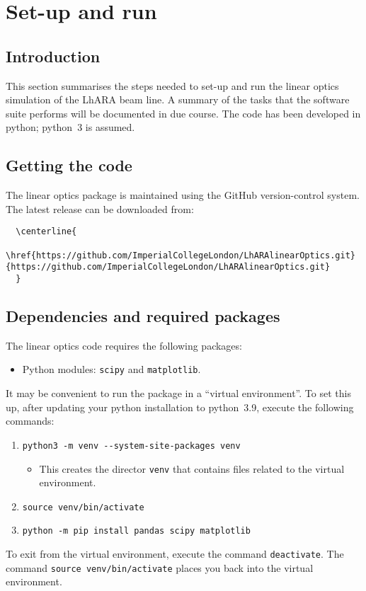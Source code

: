 \section{Set-up and run}

\subsection*{Introduction}
This section summarises the steps needed to set-up and run
the linear optics simulation of the LhARA beam line.
A summary of the tasks that the software suite performs
will be documented in due course.
The code has been developed in python; python~3 is assumed.

\subsection*{Getting the code}
The linear optics package is maintained using the GitHub
version-control system.
The latest release can be downloaded from: \\
\begin{verbatim}
  \centerline{
    \href{https://github.com/ImperialCollegeLondon/LhARAlinearOptics.git}{https://github.com/ImperialCollegeLondon/LhARAlinearOptics.git}
  }
\end{verbatim}
  
\subsection*{Dependencies and required packages}
The linear optics code requires the following packages:
\begin{itemize}
  \item Python modules: \verb+scipy+ and \verb+matplotlib+. 
\end{itemize}
It may be convenient to run the package in a ``virtual environment''.
To set this up, after updating your python installation to python~3.9,
execute the following commands:
\begin{enumerate}
  \item \verb+python3 -m venv --system-site-packages venv+
    \begin{itemize}
      \item This creates the director \verb+venv+ that contains files
        related to the virtual environment.
    \end{itemize}
  \item \verb+source venv/bin/activate+
  \item \verb+python -m pip install pandas scipy matplotlib+
\end{enumerate}
To exit from the virtual environment, execute the command
\verb+deactivate+. 
The command \verb+source venv/bin/activate+ places you back
into the virtual environment.

